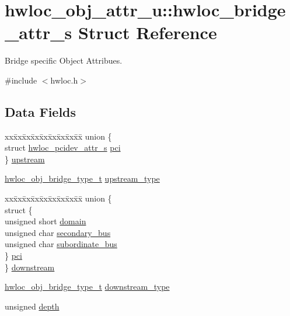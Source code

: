 \hypertarget{a00012}{
\section{hwloc\_\-obj\_\-attr\_\-u::hwloc\_\-bridge\_\-attr\_\-s Struct Reference}
\label{a00012}
}


Bridge specific Object Attribues.  




{\ttfamily \#include $<$hwloc.h$>$}

\subsection*{Data Fields}
\begin{DoxyCompactItemize}
\item 
\begin{tabbing}
xx\=xx\=xx\=xx\=xx\=xx\=xx\=xx\=xx\=\kill
union \{\\
\>struct \hyperlink{a00022}{hwloc\_pcidev\_attr\_s} \hyperlink{a00012_ab5c564e7c95b747dae9eb84ec0a2c31e}{pci}\\
\} \hyperlink{a00012_a00ce9d99fc8792d1044fe25dc58605fe}{upstream}\\

\end{tabbing}\item 
\hyperlink{a00041_ga0a947e8c5adcc729b126bd09c01a0153}{hwloc\_\-obj\_\-bridge\_\-type\_\-t} \hyperlink{a00012_a265dd2164aa2df4972e25a029da72125}{upstream\_\-type}
\item 
\begin{tabbing}
xx\=xx\=xx\=xx\=xx\=xx\=xx\=xx\=xx\=\kill
union \{\\
\>struct \{\\
\>\>unsigned short \hyperlink{a00012_a2c31e565a5f0d23d0a0a3dd3ec8f4b17}{domain}\\
\>\>unsigned char \hyperlink{a00012_ae2d9dd73ef1d32045c584a8e66d2f83f}{secondary\_bus}\\
\>\>unsigned char \hyperlink{a00012_af3f3f7d76bf03e8d2afa721c2b8d6771}{subordinate\_bus}\\
\>\} \hyperlink{a00012_a5a20be20e09d811d141b6332ff864706}{pci}\\
\} \hyperlink{a00012_acaf1ae02e37182bbb6966f8c4f35e499}{downstream}\\

\end{tabbing}\item 
\hyperlink{a00041_ga0a947e8c5adcc729b126bd09c01a0153}{hwloc\_\-obj\_\-bridge\_\-type\_\-t} \hyperlink{a00012_ac6a169b672d0e9f75756fd5665828b93}{downstream\_\-type}
\item 
unsigned \hyperlink{a00012_a336c8b22893d5d734d8c9dfca4066b46}{depth}
\end{DoxyCompactItemize}


